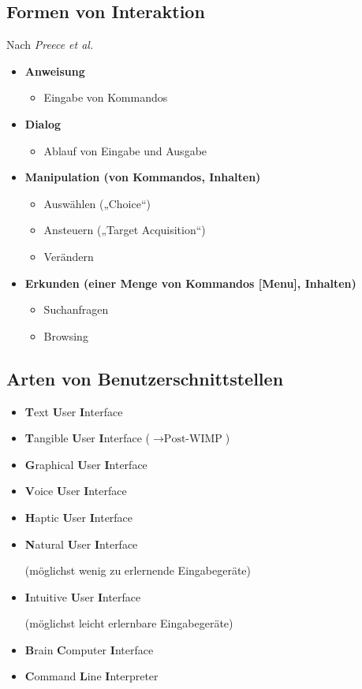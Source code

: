 \documentclass
[
	8pt,		%
	ngerman,	%
	a4paper,	%
	landscape,	%
	final		%
]{extarticle}
\begin{document}
\begin{multicols*}{4}
	\subsection{Formen von Interaktion}
	Nach \emph{Preece et al.}
	\begin{itemize}
		\item \textbf{Anweisung}
		      \begin{itemize}
			      \item Eingabe von Kommandos
		      \end{itemize}
		\item \textbf{Dialog}
		      \begin{itemize}
			      \item Ablauf von Eingabe und Ausgabe
		      \end{itemize}
		\item \textbf{Manipulation (von Kommandos, Inhalten)}
		      \begin{itemize}
			      \item Auswählen („Choice“)
			      \item Ansteuern („Target Acquisition“)
			      \item Verändern
		      \end{itemize}
		\item \textbf{Erkunden (einer Menge von Kommandos [Menu], Inhalten)}
		      \begin{itemize}
			      \item Suchanfragen
			      \item Browsing
		      \end{itemize}
	\end{itemize}
	\subsection{Arten von Benutzerschnittstellen}
	\begin{itemize}
		\item \textbf{T}ext \textbf{U}ser \textbf{I}nterface
		\item \textbf{T}angible \textbf{U}ser \textbf{I}nterface (\(\rightarrow \text{Post-WIMP}\))
		\item \textbf{G}raphical \textbf{U}ser \textbf{I}nterface
		\item \textbf{V}oice \textbf{U}ser \textbf{I}nterface
		\item \textbf{H}aptic \textbf{U}ser \textbf{I}nterface
		\item \textbf{N}atural \textbf{U}ser \textbf{I}nterface\par
		      (möglichst wenig zu erlernende Eingabegeräte)
		\item \textbf{I}ntuitive \textbf{U}ser \textbf{I}nterface\par
		      (möglichst leicht erlernbare Eingabegeräte)
		\item \textbf{B}rain \textbf{C}omputer \textbf{I}nterface
		\item \textbf{C}ommand \textbf{L}ine \textbf{I}nterpreter
	\end{itemize}

\end{multicols*}
\end{document}
